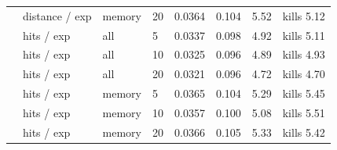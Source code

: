 \begin{tabular}{llllcccc}
 & distance / exp & memory & 20 & 0.0364 & 0.104 & 5.52 & kills 5.12 \\
 & hits / exp & all & 5 & 0.0337 & 0.098 & 4.92 & kills 5.11 \\
 & hits / exp & all & 10 & 0.0325 & 0.096 & 4.89 & kills 4.93 \\
 & hits / exp & all & 20 & 0.0321 & 0.096 & 4.72 & kills 4.70 \\
 & hits / exp & memory & 5 & 0.0365 & 0.104 & 5.29 & kills 5.45 \\
 & hits / exp & memory & 10 & 0.0357 & 0.100 & 5.08 & kills 5.51 \\
 & hits / exp & memory & 20 & 0.0366 & 0.105 & 5.33 & kills 5.42 \\
\bottomrule
\end{tabular}
